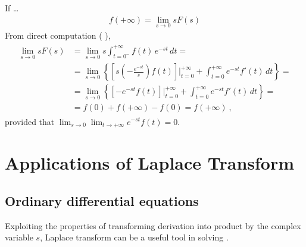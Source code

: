 \documentclass[letterpaper,10pt,english]{jupyterBook}
\begin{document}
\sphinxAtStartPar
{} If …
\begin{equation*}
\begin{split}f(+\infty) = \lim_{s \rightarrow 0} s F(s)\end{split}
\end{equation*}
\sphinxAtStartPar
From direct computation ( ),
\begin{equation*}
\begin{split}\begin{aligned}
 \lim_{s \rightarrow 0} s F(s)
 & = \lim_{s \rightarrow 0} s \int_{t = 0^-}^{+\infty} f(t) \, e^{-st} \, dt = \\
 & = \lim_{s \rightarrow 0} \left\{ \left[s \left(-\frac{e^{-st}}{s}\right)f(t) \right]\bigg|_{t=0}^{+\infty} + \int_{t=0}^{+\infty} e^{-st} f'(t) \, dt \right\} = \\
 & = \lim_{s \rightarrow 0} \left\{ \left[-e^{-st} f(t) \right]\bigg|_{t=0}^{+\infty} + \int_{t=0}^{+\infty} e^{-st} f'(t) \, dt \right\} = \\
 & = f(0) + f(+\infty) - f(0) = f(+\infty) \ ,
\end{aligned}\end{split}
\end{equation*}
\sphinxAtStartPar
provided that \(\lim_{s \rightarrow 0} \lim_{t \rightarrow +\infty} e^{-s t} f(t) = 0\).

\sphinxstepscope


\section{Applications of Laplace Transform}
\label{\detokenize{ch/complex/laplace-applications:applications-of-laplace-transform}}\label{\detokenize{ch/complex/laplace-applications:complex-laplace-applications}}\label{\detokenize{ch/complex/laplace-applications::doc}}

\subsection{Ordinary differential equations}
\label{\detokenize{ch/complex/laplace-applications:ordinary-differential-equations}}
\sphinxAtStartPar
Exploiting the properties of transforming derivation into product by the complex variable \(s\), Laplace transform can be a useful tool in solving {\hyperref[\detokenize{ch/ode/intro:ode-intro}]{}}.
\end{document}
